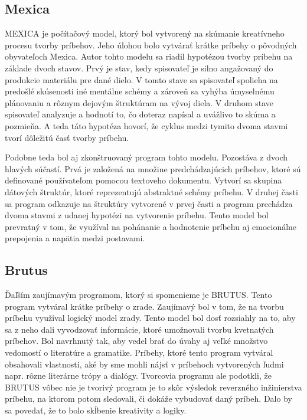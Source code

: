 \subsection{Mexica}
MEXICA\cite{mexica} je počítačový model, ktorý bol vytvorený na skúmanie kreatívneho procesu tvorby príbehov. Jeho úlohou bolo vytvárať krátke príbehy o pôvodných obyvateľoch Mexica. Autor tohto modelu sa riadil hypotézou tvorby príbehu na základe dvoch stavov. Prvý je stav, kedy spisovateľ je silno angažovaný do produkcie materiálu pre dané dielo. V tomto stave sa spisovateľ spolieha na predošlé skúsenosti iné mentálne schémy a zároveň sa vyhýba úmyselnému plánovaniu a rôznym dejovým štruktúram na vývoj diela. V druhom stave spisovateľ analyzuje a hodnotí to, čo doteraz napísal a uvážlivo to skúma a pozmieňa. A teda táto hypotéza hovorí, že cyklus medzi tymito dvoma stavmi tvorí dôležitú časť tvorby príbehu.\par
Podobne teda bol aj zkonštruovaný program tohto modelu. Pozostáva z dvoch hlavých súčastí. Prvá je založená na množine predchádzajúcich príbehov, ktoré sú definované používateľom pomocou textoveho dokumentu. Vytvorí sa skupina dátových štruktúr, ktoré reprezentujú abstraktné schémy príbehu. V druhej časti sa program odkazuje na štruktúry vytvorené v prvej časti a program prechádza dvoma stavmi z udanej hypotézi na vytvorenie príbehu. Tento model bol prevratný v tom, že využíval na pohánanie a hodnotenie príbehu aj emocionálne prepojenia a napätia medzi postavami.
\subsection{Brutus}
Ďaľším zaujímavým programom, ktorý si spomenieme je BRUTUS\cite{brutus}. Tento program vytváral krátke príbehy o zrade. Zaujímavý bol v tom, že na tvorbu príbehu využíval logický model zrady. Tento model bol dosť rozsiahly na to, aby sa z neho dali vyvodzovať informácie, ktoré umožnovali tvorbu kvetnatých príbehov. Bol navrhnutý tak, aby vedel brať do úvahy aj veľké množstvo vedomostí o literatúre a gramatike. Príbehy, ktoré tento program vytváral obsahovali vlastnosti, aké by sme mohli nájsť v príbehoch vytvorených ľudmi napr. rôzne literárne trópy a dialógy. Tvorcovia programu ale podotkli, že BRUTUS vôbec nie je tvorivý program je to skôr výsledok reverzného inžinierstva príbehu, na ktorom potom sledovali, či dokáže vybudovať daný príbeh. Dalo by sa povedať, že to bolo skĺbenie kreativity a logiky.
